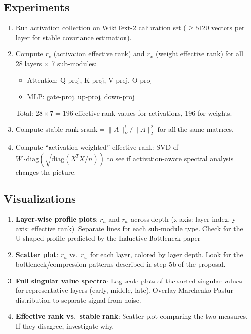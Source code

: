 \documentclass[11pt,a4paper]{article}
\begin{document}
\subsection{Experiments}
\begin{enumerate}
    \item Run activation collection on WikiText-2 calibration set ($\geq$5120 vectors per layer for stable covariance estimation).
    \item Compute $r_u$ (activation effective rank) and $r_w$ (weight effective rank) for all 28 layers $\times$ 7 sub-modules:
    \begin{itemize}
        \item Attention: Q-proj, K-proj, V-proj, O-proj
        \item MLP: gate-proj, up-proj, down-proj
    \end{itemize}
    Total: $28 \times 7 = 196$ effective rank values for activations, 196 for weights.

    \item Compute stable rank $\text{srank} = \|A\|_F^2 / \|A\|_2^2$ for all the same matrices.

    \item Compute ``activation-weighted'' effective rank: SVD of $W \cdot \text{diag}(\sqrt{\text{diag}(X^TX/n)})$ to see if activation-aware spectral analysis changes the picture.
\end{enumerate}

\subsection{Visualizations}
\begin{enumerate}
    \item \textbf{Layer-wise profile plots}: $r_u$ and $r_w$ across depth (x-axis: layer index, y-axis: effective rank). Separate lines for each sub-module type. Check for the U-shaped profile predicted by the Inductive Bottleneck paper.

    \item \textbf{Scatter plot}: $r_u$ vs.\ $r_w$ for each layer, colored by layer depth. Look for the bottleneck/compression patterns described in step 5b of the proposal.

    \item \textbf{Full singular value spectra}: Log-scale plots of the sorted singular values for representative layers (early, middle, late). Overlay Marchenko-Pastur distribution to separate signal from noise.

    \item \textbf{Effective rank vs.\ stable rank}: Scatter plot comparing the two measures. If they disagree, investigate why.
\end{enumerate}
\end{document}
